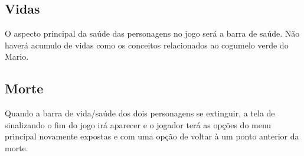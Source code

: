 \documentclass[12pt]{article}
\begin{document}
\subsection{Vidas}
O aspecto principal da saúde das personagens no jogo será a barra de saúde. Não haverá acumulo de vidas como os conceitos relacionados ao cogumelo verde do Mario.

\subsection{Morte}
Quando a barra de vida/saúde dos dois personagens se extinguir, a tela de sinalizando o fim do jogo irá aparecer e o jogador terá as opções do menu principal novamente expostas e com uma opção de voltar à um ponto anterior da morte.
\end{document}
